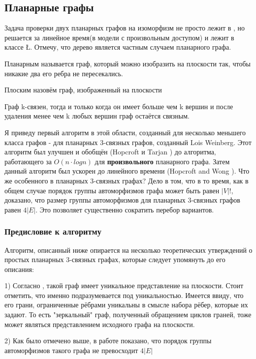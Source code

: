 \subsection{Планарные графы}
Задача проверки двух планарных графов на изоморфизм не просто лежит в \poly, но решается за линейное время(в модели с произвольным доступом) \cite{1} и лежит в классе \L\cite{2}. Отмечу, что дерево является частным случаем планарного графа.
\begin{definition}
    Планарным называется граф, который можно изобразить на плоскости так, чтобы никакие два его ребра не пересекались.
\end{definition}
\begin{definition}
    Плоским назовём граф, изображенный на плоскости
\end{definition}
\begin{definition}
    Граф k-связен, тогда и только когда он имеет больше чем k вершин и после удаления менее чем k любых вершин граф остаётся связным. 
\end{definition}
Я приведу первый алгоритм в этой области, созданный для несколько меньшего класса графов - для планарных 3-связных графов\cite{3}, созданный Lois Weinberg. Этот алгоритм был улучшен и обобщён (Hopcroft и Tarjan \cite{6}) до алгоритма, работающего за $O(n \cdot logn)$ для \textbf{произвольного} планарного графа. Затем данный алгоритм был ускорен до линейного времени (Hopcroft and Wong \cite{1}).
Что же особенного в планарных 3-связных графах? Дело в том, что в то время, как в общем случае порядок группы автоморфизмов графа может быть равен $|V|!$, доказано\cite{4}, что размер группы автоморфизмов для планарных 3-связных графов равен $4|E|$. Это позволяет существенно сократить перебор вариантов.
\subsubsection*{Предисловие к алгоритму}
Алгоритм, описанный ниже опирается на несколько теоретических утверждений о простых планарных 3-связных графах, которые следует упомянуть до его описания:

1) Согласно \cite{5}, такой граф имеет уникальное представление на плоскости. Стоит отметить, что именно подразумевается под уникальностью. Имеется ввиду, что его грани, ограниченные рёбрами уникальны в смысле набора рёбер, которые их задают. То есть "зеркальный" граф, полученный обращением циклов граней, тоже может являться представлением исходного графа на плоскости.

2) Как было отмечено выше, в работе \cite{4} показано, что порядок группы автоморфизмов такого графа не превосходит $4|E|$

